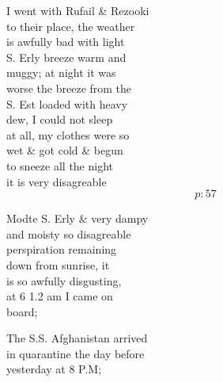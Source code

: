 \documentclass{report}
\begin{document}
	\par{
 	I went with Rufail \& Rezooki\ \\to their place, the weather\ \\is awfully bad with light\ \\S. Erly breeze warm and\ \\muggy; at night it was\ \\worse the breeze from the\ \\S. Est loaded with heavy\ \\dew, I could not sleep\ \\at all, my clothes were so\ \\wet \& got cold \& begun\ \\to sneeze all the night\ \\it is very disagreable\ \\
  \[p: 57 \]

	}







	\par{
 	Modte S. Erly \& very dampy\ \\and moisty so disagreable\ \\perspiration remaining\ \\down from sunrise, it\ \\is so awfully disgusting,\ \\at 6 1.2 am I came on\ \\board;\ \\
	}

	\par{
 	The S.S. Afghanistan arrived\ \\in quarantine the day before\ \\yesterday at 8 P.M;\ \\
	}
\end{document}
